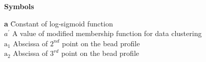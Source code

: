 {\Large \bf Symbols} \\
\noindent
\begin{tabbing}
\textbf{a} \hspace{2.0cm}\= Constant of log-sigmoid function\\
$a^{\prime}$ \>  A value of modified membership function for data clustering\\
$\mathrm{a}_\mathrm{1}$ \> Abscissa of  $2^{nd}$ point on the bead profile\\
$\mathrm{a}_\mathrm{2}$ \> Abscissa of  $3^{rd}$ point on the bead profile\\



\end{tabbing}
\newpage
\noindent

